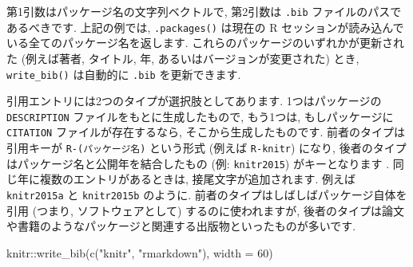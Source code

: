\documentclass[
  11pt,
  lualatex,ja=standard,jafont=noto]{bxjsreport}
\newenvironment{Shaded}{\begin{snugshade}}{\end{snugshade}}
\newcommand{\AttributeTok}[1]{\textcolor[rgb]{0.77,0.63,0.00}{#1}}
\newcommand{\DecValTok}[1]{\textcolor[rgb]{0.00,0.00,0.81}{#1}}
\newcommand{\FunctionTok}[1]{\textcolor[rgb]{0.00,0.00,0.00}{#1}}
\newcommand{\NormalTok}[1]{#1}
\newcommand{\SpecialCharTok}[1]{\textcolor[rgb]{0.00,0.00,0.00}{#1}}
\newcommand{\StringTok}[1]{\textcolor[rgb]{0.31,0.60,0.02}{#1}}
\begin{document}
第1引数はパッケージ名の文字列ベクトルで, 第2引数は \texttt{.bib} ファイルのパスであるべきです. 上記の例では, \texttt{.packages()} は現在の R セッションが読み込んでいる全てのパッケージ名を返します. これらのパッケージのいずれかが更新された (例えば著者, タイトル, 年, あるいはバージョンが変更された) とき, \texttt{write\_bib()} は自動的に \texttt{.bib} を更新できます.

引用エントリには2つのタイプが選択肢としてあります. 1つはパッケージの \texttt{DESCRIPTION} ファイルをもとに生成したもので, もう1つは, もしパッケージに \texttt{CITATION} ファイルが存在するなら, そこから生成したものです. 前者のタイプは引用キーが \texttt{R-(パッケージ名)} という形式 (例えば \texttt{R-knitr}) になり, 後者のタイプはパッケージ名と公開年を結合したもの (例: \texttt{knitr2015}) がキーとなります . 同じ年に複数のエントリがあるときは, 接尾文字が追加されます. 例えば \texttt{knitr2015a} と \texttt{knitr2015b} のように. 前者のタイプはしばしばパッケージ自体を引用 (つまり, ソフトウェアとして) するのに使われますが, 後者のタイプは論文や書籍のようなパッケージと関連する出版物といったものが多いです.

\begin{Shaded}
\begin{Highlighting}[numbers=left,,]
\NormalTok{knitr}\SpecialCharTok{::}\FunctionTok{write\_bib}\NormalTok{(}\FunctionTok{c}\NormalTok{(}\StringTok{"knitr"}\NormalTok{, }\StringTok{"rmarkdown"}\NormalTok{), }\AttributeTok{width =} \DecValTok{60}\NormalTok{)}
\end{Highlighting}
\end{Shaded}
\end{document}
